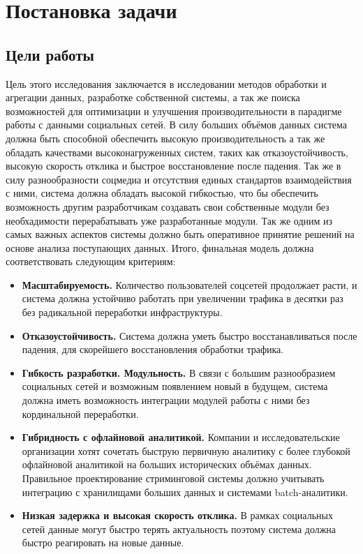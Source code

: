 \section{Постановка задачи}
\label{sec:Chapter1} 
    \subsection{Цели работы}
        Цель этого исследования заключается в исследовании методов обработки и агрегации данных, разработке собственной системы, а так же поиска возможностей для оптимизации и улучшения производительности в парадигме работы с данными социальных сетей. 
        В силу больших объёмов данных система должна быть способной обеспечить высокую производительность а так же обладать качествами высоконагруженных систем, таких как отказоустойчивость, высокую скорость отклика и быстрое восстановление после падения. Так же в силу разнообразности соцмедиа и отсутствия единых стандартов взаимодействия с ними, система должна обладать высокой гибкостью, что бы обеспечить возможность другим разработчикам создавать свои собственные модули без необхадимости перерабатывать уже разработанные модули. Так же одним из самых важных аспектов системы должно быть оперативное принятие решений на основе анализа поступающих данных. Итого, финальная модель должна соответствовать следующим критериям:
        \begin{itemize}
            \item \textbf{Масштабируемость.} Количество пользователей соцсетей продолжает расти, и система должна устойчиво работать при увеличении трафика в десятки раз без радикальной переработки инфраструктуры.
            \item \textbf{Отказоустойчивость.} Система должна уметь быстро восстанавливаться после падения, для скорейшего восстановления обработки трафика. 
            \item \textbf{Гибкость разработки. Модульность.} В связи с большим разнообразием социальных сетей и возможным появлением новый в будущем, система должна иметь возможность интеграции модулей работы с ними без кординальной переработки.
            \item \textbf{Гибридность с офлайновой аналитикой.} Компании и исследовательские организации хотят сочетать быструю первичную аналитику с более глубокой офлайновой аналитикой на больших исторических объёмах данных. Правильное проектирование стриминговой системы должно учитывать интеграцию с хранилищами больших данных и системами batch-аналитики.
            \item \textbf{Низкая задержка и высокая скорость отклика.} В рамках социальных сетей данные могут быстро терять актуальность поэтому система должна быстро реагировать на новые данные.
        \end{itemize}

